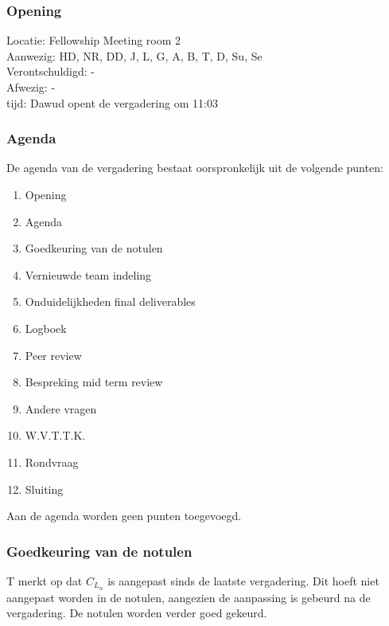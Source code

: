 \subsubsection{Opening}
Locatie: Fellowship Meeting room 2\\
Aanwezig: HD, NR, DD, J, L, G, A, B, T, D, Su, Se\\
Verontschuldigd: - \\
Afwezig: - \\
tijd: Dawud opent de vergadering om 11:03\\

\subsubsection{Agenda}
De agenda van de vergadering bestaat oorspronkelijk uit de volgende punten:
\begin{enumerate}
\item Opening
\item Agenda
\item Goedkeuring van de notulen
\item Vernieuwde team indeling
\item Onduidelijkheden final deliverables
\item Logboek
\item Peer review
\item Bespreking mid term review
\item Andere vragen
\item W.V.T.T.K.
\item Rondvraag
\item Sluiting
\end{enumerate}

Aan de agenda worden geen punten toegevoegd.

\subsubsection{Goedkeuring van de notulen}
T merkt op dat $C_{L_\alpha}$ is aangepast sinds de laatste vergadering. Dit hoeft niet aangepast worden in de notulen, aangezien de aanpassing is gebeurd na de vergadering.
\newline\newline
De notulen worden verder goed gekeurd.


